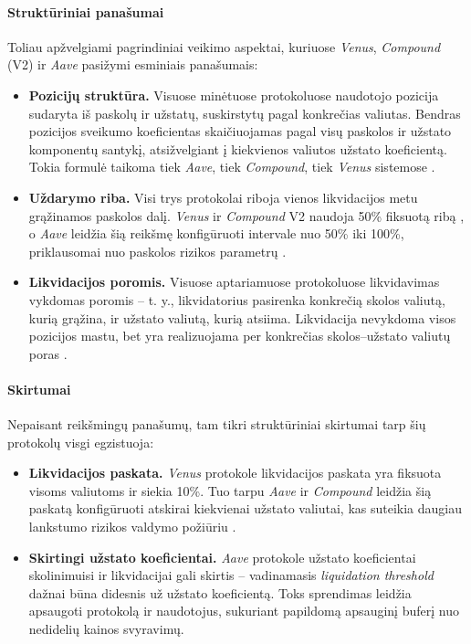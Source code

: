 \documentclass[]{VUMIFTemplateClass}
\begin{document}

\paragraph{Struktūriniai panašumai} Toliau apžvelgiami pagrindiniai veikimo aspektai, kuriuose \textit{Venus}, \textit{Compound} (V2) ir \textit{Aave} pasižymi esminiais panašumais:

\begin{itemize}
    \item \textbf{Pozicijų struktūra.} Visuose minėtuose protokoluose naudotojo pozicija sudaryta iš paskolų ir užstatų, suskirstytų pagal konkrečias valiutas. Bendras pozicijos sveikumo koeficientas skaičiuojamas pagal visų paskolos ir užstato komponentų santykį, atsižvelgiant į kiekvienos valiutos užstato koeficientą. Tokia formulė taikoma tiek \textit{Aave}, tiek \textit{Compound}, tiek \textit{Venus} sistemose \cite{aave-risks, compound-positionstructure}.

    \item \textbf{Uždarymo riba.} Visi trys protokolai riboja vienos likvidacijos metu grąžinamos paskolos dalį. \textit{Venus} ir \textit{Compound} V2 naudoja 50\% fiksuotą ribą \cite{compound-closefactor}, o \textit{Aave} leidžia šią reikšmę konfigūruoti intervale nuo 50\% iki 100\%, priklausomai nuo paskolos rizikos parametrų \cite{aave-liquidation}.

    \item \textbf{Likvidacijos poromis.} Visuose aptariamuose protokoluose likvidavimas vykdomas poromis – t. y., likvidatorius pasirenka konkrečią skolos valiutą, kurią grąžina, ir užstato valiutą, kurią atsiima. Likvidacija nevykdoma visos pozicijos mastu, bet yra realizuojama per konkrečias skolos–užstato valiutų poras \cite{compound-liquidation, aave-liquidation}.
\end{itemize}

\paragraph{Skirtumai} Nepaisant reikšmingų panašumų, tam tikri struktūriniai skirtumai tarp šių protokolų visgi egzistuoja:

\begin{itemize}
    \item \textbf{Likvidacijos paskata.} \textit{Venus} protokole likvidacijos paskata yra fiksuota visoms valiutoms ir siekia 10\%. Tuo tarpu \textit{Aave} ir \textit{Compound} leidžia šią paskatą konfigūruoti atskirai kiekvienai užstato valiutai, kas suteikia daugiau lankstumo rizikos valdymo požiūriu \cite{compound-incentive, aave-liquidation}.

    \item \textbf{Skirtingi užstato koeficientai.} \textit{Aave} protokole užstato koeficientai skolinimuisi ir likvidacijai gali skirtis – vadinamasis \textit{liquidation threshold} dažnai būna didesnis už užstato koeficientą. Toks sprendimas leidžia apsaugoti protokolą ir naudotojus, sukuriant papildomą apsauginį buferį nuo nedidelių kainos svyravimų.
\end{itemize}
\end{document}
